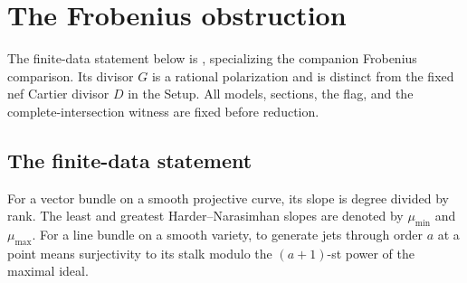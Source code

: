 \documentclass[12pt,a4paper,psamsfonts]{amsart}
\theoremstyle{definition}
\theoremstyle{plain}
\begin{document}
\section{The Frobenius obstruction}\label{sec:frobenius}
The finite-data statement below is \cite[Theorem~6.1]{NS},
specializing the companion Frobenius comparison. Its divisor $G$
is a rational polarization and is distinct from the fixed nef
Cartier divisor $D$ in the Setup. All models, sections, the flag,
and the complete-intersection witness are fixed before reduction.
\subsection{The finite-data statement}

For a vector bundle on a smooth projective curve, its slope is
degree divided by rank. The least and greatest Harder--Narasimhan
slopes are denoted by $\mu_{\min}$ and $\mu_{\max}$.
For a line bundle on a smooth variety, to generate jets through
order $a$ at a point means surjectivity to its stalk modulo
the $(a+1)$-st power of the maximal ideal.
\end{document}
